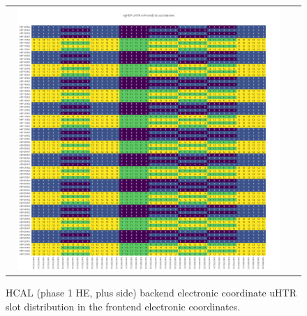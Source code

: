 \clearpage
\begin{figure}[htb]
 \begin{center}
  \begin{tabular}{cc}
   \includegraphics[angle=0,width=0.95\textwidth]{figures/appendix/ngHEP_uHTR_in_FrontEnd.png}
  \end{tabular}
  \caption{HCAL (phase 1 HE, plus side) backend electronic coordinate uHTR slot distribution in the frontend electronic coordinates.}
  \label{fig:lmapngHEPuHTRFEC}
 \end{center}
\end{figure}

